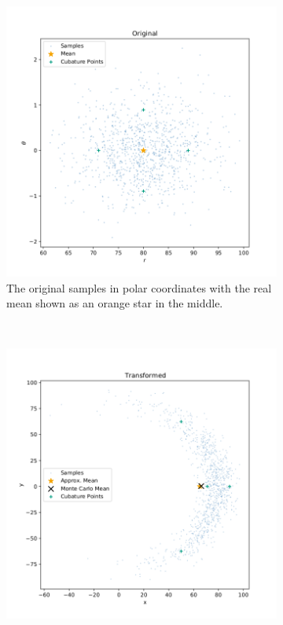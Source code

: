 	\begin{figure}
		\centering
		\begin{subfigure}[t]{0.5\linewidth}
			\centering
			\includegraphics[width = \linewidth]{figures/inference/cubature/spherical-radial-cubature-original.png}
			\caption[Original samples in polar coordinates to illustrate cubature rules]{The original samples in polar coordinates with the real mean shown as an orange star in the middle.}
		\end{subfigure}%
		~
		\begin{subfigure}[t]{0.5\linewidth}
			\centering
			\includegraphics[width = \linewidth]{figures/inference/cubature/spherical-radial-cubature-transformed.png}

\end{subfigure}
\end{figure}
